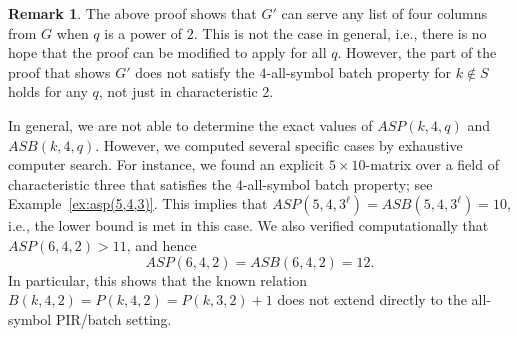 \documentclass[11pt,a4paper]{article}
\theoremstyle{definition}
\newtheorem{remark}[theorem]{Remark}
\begin{document}
\begin{remark}
The above proof shows that $G'$ can serve any list of four columns from $G$ when $q$ is a power of $2$. This is not the case in general, i.e., there is no hope that the proof can be modified to apply for all $q$. However, the part of the proof that shows $G'$ does not satisfy the $4$-all-symbol batch property for $k \not \in S$ holds for any $q$, not just in characteristic 2.
\end{remark}

In general, we are not able to determine the exact values of $ASP(k,4,q)$ and $ASB(k,4,q)$. However, we computed several specific cases by exhaustive computer search. For instance, we found an explicit $5 \times 10$-matrix over a field of characteristic three that satisfies the $4$-all-symbol batch property; see Example~\ref{ex:asp(5,4,3)}. This implies that $ASP(5,4,3^\ell) = ASB(5,4,3^\ell) = 10$, i.e., the lower bound is met in this case. We also verified computationally that $ASP(6,4,2)  > 11$, and hence 
$$
    ASP(6,4,2) = ASB(6,4,2) = 12.
$$
In particular, this shows that the known relation $B(k,4,2) = P(k,4,2) = P(k,3,2) + 1$ does not extend directly to the all-symbol PIR/batch setting.
\end{document}
